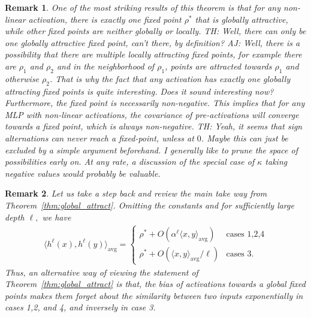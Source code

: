 \documentclass[twoside]{article}
\newcommand{\avg}{\mathrm{avg}}
\newtheorem{remark}{Remark}
\theoremstyle{definition}
\newcommand{\thomas}[1]{{\color{blue}TH:  \textit{#1}}}
\newcommand{\amir}[1]{{\color{cyan}AJ:  \textit{#1}}}
\begin{document}
\begin{remark}
One of the most striking results of this theorem is that for any non-linear activation, there is exactly one fixed point $\rho^*$ that is globally attractive, while other fixed points are neither globally or locally. 
\thomas{Well, there can only be one globally attractive fixed point, can't there, by definition?} 
\amir{Well, there is a possibility that there are multiple locally attracting fixed points, for example there are $\rho_1$ and $\rho_2$ and in the neighborhood of $\rho_1$, points are attracted towards $\rho_1$ and otherwise $\rho_2$. That is why the fact that any activation has exactly one globally attracting fixed points is quite interesting. Does it sound interesting now? }
Furthermore, the fixed point is necessarily non-negative. This implies that for any MLP with non-linear activations, the covariance of pre-activations will converge towards a fixed point, which is always non-negative. 
\thomas{Yeah, it seems that sign alternations can never reach a fixed-point, unless at $0$. Maybe this can just be excluded by a simple argument beforehand. I generally like to prune the space of possibilities early on. At any rate, a discussion of the special case of $\kappa$ taking negative values would probably be valuable.}
\end{remark}

\begin{remark}
    Let us take a step back and review the main take way from Theorem~\ref{thm:global_attract}. Omitting the constants and for sufficiently large depth $\ell,$ we have 
    \begin{align*}
        \langle h^{\ell}(x), h^{\ell}(y)\rangle_\avg =  \begin{cases}
             \rho^* + O(\alpha ^ \ell \langle x, y \rangle_\avg)  & \text{cases 1,2,4}\\
             \rho^* + O \left(\langle x, y \rangle_\avg/\ell \right)   & \text{cases 3}.
        \end{cases}
    \end{align*}
    Thus, an alternative way of viewing the statement of Theorem~\ref{thm:global_attract} is that, the bias of activations towards a global fixed points makes them forget about the similarity between two inputs exponentially in cases 1,2, and 4, and inversely in case 3.  
\end{remark}

\end{document}
